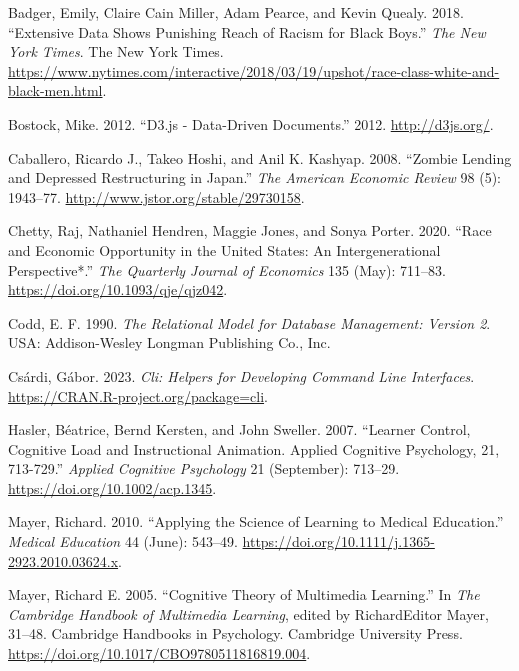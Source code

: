 \hypertarget{refs}{}
\begin{CSLReferences}{1}{0}
\leavevmode{}%
Badger, Emily, Claire Cain Miller, Adam Pearce, and Kevin Quealy. 2018. {``Extensive Data Shows Punishing Reach of Racism for Black Boys.''} \emph{The New York Times}. The New York Times. \url{https://www.nytimes.com/interactive/2018/03/19/upshot/race-class-white-and-black-men.html}.

\leavevmode{}%
Bostock, Mike. 2012. {``D3.js - Data-Driven Documents.''} 2012. \url{http://d3js.org/}.

\leavevmode{}%
Caballero, Ricardo J., Takeo Hoshi, and Anil K. Kashyap. 2008. {``Zombie Lending and Depressed Restructuring in {J}apan.''} \emph{The American Economic Review} 98 (5): 1943--77. \url{http://www.jstor.org/stable/29730158}.

\leavevmode{}%
Chetty, Raj, Nathaniel Hendren, Maggie Jones, and Sonya Porter. 2020. {``Race and Economic Opportunity in the United States: An Intergenerational Perspective*.''} \emph{The Quarterly Journal of Economics} 135 (May): 711--83. \url{https://doi.org/10.1093/qje/qjz042}.

\leavevmode{}%
Codd, E. F. 1990. \emph{The Relational Model for Database Management: Version 2}. USA: Addison-Wesley Longman Publishing Co., Inc.

\leavevmode{}%
Csárdi, Gábor. 2023. \emph{Cli: Helpers for Developing Command Line Interfaces}. \url{https://CRAN.R-project.org/package=cli}.

\leavevmode{}%
Hasler, Béatrice, Bernd Kersten, and John Sweller. 2007. {``Learner Control, Cognitive Load and Instructional Animation. Applied Cognitive Psychology, 21, 713-729.''} \emph{Applied Cognitive Psychology} 21 (September): 713--29. \url{https://doi.org/10.1002/acp.1345}.

\leavevmode{}%
Mayer, Richard. 2010. {``Applying the Science of Learning to Medical Education.''} \emph{Medical Education} 44 (June): 543--49. \url{https://doi.org/10.1111/j.1365-2923.2010.03624.x}.

\leavevmode{}%
Mayer, Richard E. 2005. {``Cognitive Theory of Multimedia Learning.''} In \emph{The Cambridge Handbook of Multimedia Learning}, edited by RichardEditor Mayer, 31--48. Cambridge Handbooks in Psychology. Cambridge University Press. \url{https://doi.org/10.1017/CBO9780511816819.004}.


\end{CSLReferences}
